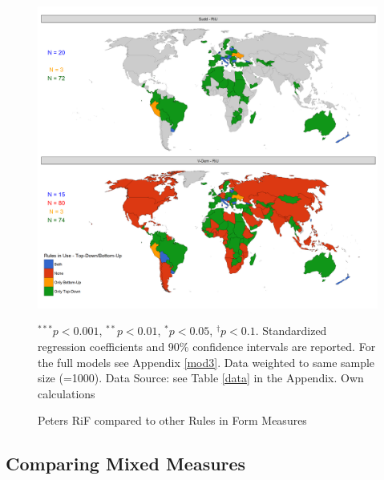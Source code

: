 \documentclass{systats}
\begin{document}
\begin{figure}
	\caption{Peters RiF compared to other Rules in Form Measures}
	\label{reg2}
	\includegraphics[width=\textwidth]{images/map_riu.png}
	\flushright
	{\scriptsize $^{***}p<0.001$, $^{**}p<0.01$, $^*p<0.05$, $^{\dagger}p<0.1$. Standardized regression coefficients and 90\% confidence intervals are reported. For the full models see Appendix \ref{mod3}. Data weighted to same sample size (=1000). Data Source: see Table \ref{data} in the Appendix. Own calculations  \par}
\end{figure}




\subsection{Comparing Mixed Measures}
\end{document}
